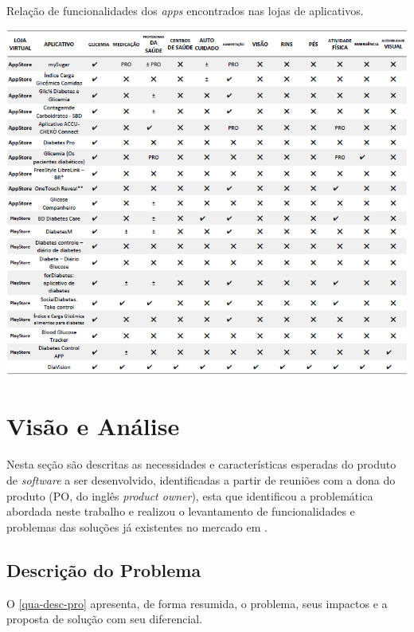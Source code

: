 \begin{table}[htb]
    \caption{\label{tab_cor_func}Relação de funcionalidades dos \emph{apps} encontrados nas lojas de aplicativos.}
    \begin{center}
        \includegraphics[scale=0.75]{Imagens/proposta/busca_anterioridade.png}
    \end{center}
\end{table}

\newpage

\section{Visão e Análise}

Nesta seção são descritas as necessidades e características esperadas do produto de \emph{software} a ser desenvolvido, identificadas a partir de
reuniões com a dona do produto (PO, do inglês \emph{product owner}), esta que identificou a problemática abordada neste trabalho e
realizou o levantamento de funcionalidades e problemas das soluções já existentes no mercado em .

\subsection{Descrição do Problema}

O \autoref{qua-desc-pro} apresenta, de forma resumida, o problema, seus impactos e a proposta de solução com seu diferencial.

